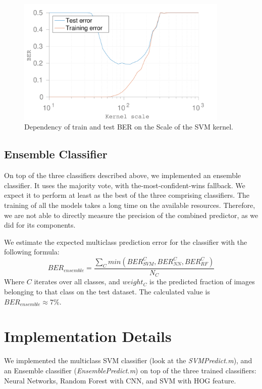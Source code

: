 \documentclass{article} %
\begin{document}
\begin{figure}[!t]
  \centering
  \includegraphics[width=0.9\textwidth]{figures/kernel_scale_ber.pdf}
  \caption{Dependency of train and test BER on the Scale of the SVM kernel.}
  \label{fig:SVMKernelScaleBER}
\end{figure}

\subsection{Ensemble Classifier}

On top of the three classifiers described above, we implemented an ensemble classifier. It uses the majority vote, with the-most-confident-wins fallback. We expect it to perform at least as the best of the three comprising classifiers. The training of all the models takes a long time on the available resources. Therefore, we are not able to directly measure the precision of the combined predictor, as we did for its components.

We estimate the expected multiclass prediction error for the classifier with the following formula:
\[
BER_{ensemble} = \frac{\sum_C min(BER_{SVM}^C, BER_{NN}^C, BER_{RF}^C)}{N_C}
\]
Where $C$ iterates over all classes, and $weight_C$ is the predicted fraction of images belonging to that class on the test dataset. The calculated value is $BER_{ensemble} \approx 7\%$.

\section{Implementation Details}

We implemented the multiclass SVM classifier (look at the \emph{SVMPredict.m}), and an Ensemble classifier (\emph{EnsemblePredict.m}) on top of the three trained classifiers: Neural Networks, Random Forest with CNN, and SVM with HOG feature.
\end{document}
